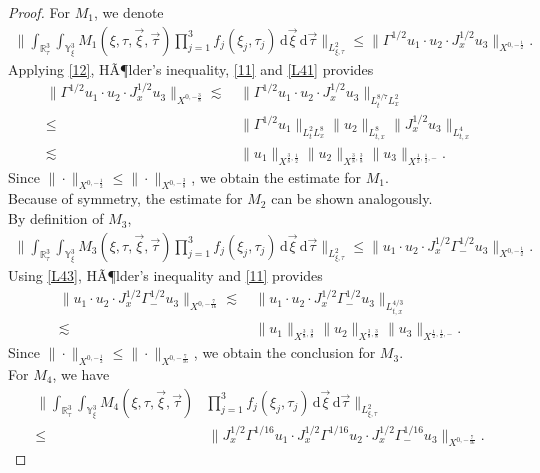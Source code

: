 \documentclass[reqno]{amsart}
\theoremstyle{Definitionl}
\theoremstyle{Definitionk}
\theoremstyle{definition}
\theoremstyle{Satzk}
\theoremstyle{Satzl}
\theoremstyle{Bemerkung}
\begin{document}
\begin{proof}
For $M_1$, we denote
\begin{align*}
\Big\|\int_{\mathbb R^3_\tau}\int_{\mathbb Y^3_\xi}M_1(\xi,\tau,\vec\xi,\vec\tau)\prod_{j=1}^3f_j(\xi_j,\tau_j)\,\mathrm d\vec\xi\,\mathrm d\vec\tau\Big\|_{L^2_{\xi,\tau}}\le \|\Gamma^{1/2}u_1\cdot u_2\cdot J_x^{1/2}u_3\|_{X^{0,-\frac12}}.
\end{align*}
Applying \eqref{12}, HÃ¶lder's inequality, \eqref{11} and \eqref{L41} provides
\begin{align}
\|\Gamma^{1/2}u_1\cdot u_2\cdot J_x^{1/2}u_3\|_{X^{0,-\frac38}}\lesssim&\, \|\Gamma^{1/2}u_1\cdot u_2\cdot J_x^{1/2}u_3\|_{L^{8/7}_tL^2_x}\nonumber\\
\le&\, \|\Gamma^{1/2}u_1\|_{L^2_tL^8_x}\|u_2\|_{L^8_{t,x}}\|J_x^{1/2}u_3\|_{L^4_{t,x}}\nonumber\\
\lesssim&\, \|u_1\|_{X^{\frac38,\frac12}}\|u_2\|_{X^{\frac38,\frac38}}\|u_3\|_{X^{\frac12,\frac12,-}}.\label{m11}
\end{align}
Since $\|\cdot\|_{X^{0,-\frac12}}\le\|\cdot\|_{X^{0,-\frac38}}$, we obtain the estimate for $M_1$.\\[10pt]
Because of symmetry, the estimate for $M_2$ can be shown analogously.\\[10pt]
By definition of $M_3$,
\begin{align*}
\Big\|\int_{\mathbb R^3_\tau}\int_{\mathbb Y^3_\xi}M_3(\xi,\tau,\vec\xi,\vec\tau)\prod_{j=1}^3f_{j}(\xi_j,\tau_j)\,\mathrm d\vec\xi\,\mathrm d\vec\tau\Big\|_{L^2_{\xi,\tau}}\le \|u_1\cdot u_2\cdot J_x^{1/2}\Gamma_-^{1/2}u_3\|_{X^{0,-\frac12}}.
\end{align*}
Using \eqref{L43}, HÃ¶lder's inequality and \eqref{11} provides
\begin{align}
\|u_1\cdot u_2\cdot J_x^{1/2}\Gamma_-^{1/2}u_3\|_{X^{0,-\frac{7}{16}}}\lesssim&\, \|u_1\cdot u_2\cdot J_x^{1/2}\Gamma_-^{1/2}u_3\|_{L^{4/3}_{t,x}}\nonumber\\
\lesssim&\, \|u_1\|_{X^{\frac38,\frac38}}\|u_2\|_{X^{\frac38,\frac38}}\|u_3\|_{X^{\frac12,\frac12,-}}\label{m33}.
\end{align}
Since $\|\cdot\|_{X^{0,-\frac12}}\le\|\cdot\|_{X^{0,-\frac7{16}}}$, we obtain the conclusion for $M_3$.\\[10pt]
For $M_4$, we have
\begin{align*}
\Big\|\int_{\mathbb R^3_\tau}\int_{\mathbb Y^3_\xi}M_4(\xi,\tau,\vec\xi,\vec\tau)&\prod_{j=1}^3f_{j}(\xi_j,\tau_j)\,\mathrm d\vec\xi\,\mathrm d\vec\tau\Big\|_{L^2_{\xi,\tau}}\\
\le&\, \big\|J_x^{1/2}\Gamma^{1/16}u_1\cdot J_x^{1/2}\Gamma^{1/16}u_2\cdot J_x^{1/2}\Gamma_-^{1/16}u_3\big\|_{X^{0,-\frac{7}{16}}}.

\end{align*}
\end{proof}
\end{document}
